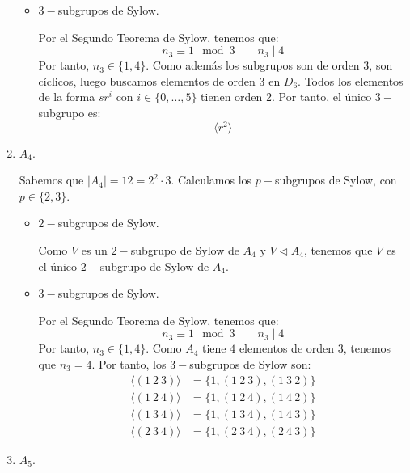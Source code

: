 \begin{ejercicio}
\begin{enumerate}
\begin{itemize}
            \item $3-$subgrupos de Sylow.
            
            Por el Segundo Teorema de Sylow, tenemos que:
            \begin{equation*}
                n_3 \equiv 1 \mod 3 \qquad n_3 \mid 4
            \end{equation*}
            Por tanto, $n_3\in \{1,4\}$. Como además los subgrupos son de orden $3$, son cíclicos, luego buscamos elementos de orden $3$ en $D_6$. Todos los elementos de la forma $sr^i$ con $i\in \{0,\dots,5\}$ tienen orden 2. Por tanto, el único $3-$subgrupo es:
            \begin{equation*}
                \langle r^2\rangle
            \end{equation*}
        \end{itemize}

        \item $A_4$.
        
        Sabemos que $|A_4|=12=2^2\cdot 3$. Calculamos los $p-$subgrupos de Sylow, con $p\in \{2,3\}$.
        \begin{itemize}
            \item $2-$subgrupos de Sylow.
            
            Como $V$ es un $2-$subgrupo de Sylow de $A_4$ y $V\lhd A_4$, tenemos que $V$ es el único $2-$subgrupo de Sylow de $A_4$.
            \item $3-$subgrupos de Sylow.
            
            Por el Segundo Teorema de Sylow, tenemos que:
            \begin{equation*}
                n_3 \equiv 1 \mod 3 \qquad n_3 \mid 4
            \end{equation*}
            Por tanto, $n_3\in \{1,4\}$. Como $A_4$ tiene $4$ elementos de orden $3$, tenemos que $n_3=4$. Por tanto, los $3-$subgrupos de Sylow son:
            \begin{align*}
                \langle (1\ 2\ 3) \rangle &= \{1,(1\ 2\ 3),(1\ 3\ 2)\}\\
                \langle (1\ 2\ 4) \rangle &= \{1,(1\ 2\ 4),(1\ 4\ 2)\}\\
                \langle (1\ 3\ 4) \rangle &= \{1,(1\ 3\ 4),(1\ 4\ 3)\}\\
                \langle (2\ 3\ 4) \rangle &= \{1,(2\ 3\ 4),(2\ 4\ 3)\}
            \end{align*}
        \end{itemize}
        \item $A_5$.
        

\end{enumerate}
\end{ejercicio}
